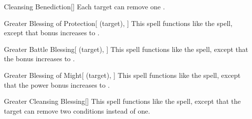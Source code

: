 \lowercase{\hypertarget{spell:Cleansing Benediction}{}}\label{spell:Cleansing Benediction}
\begin{freeability}[Rank 5]{\hypertarget{spell:Cleansing Benediction}{Cleansing Benediction}}[]
Each target can remove one .
\end{freeability}
\vspace{0.25em}



\lowercase{\hypertarget{spell:Greater Blessing of Protection}{}}\label{spell:Greater Blessing of Protection}
\begin{attuneability}[Rank 5]{\hypertarget{spell:Greater Blessing of Protection}{Greater Blessing of Protection}}[ (target), ]
This spell functions like the  spell, except that bonus increases to .
\end{attuneability}
\vspace{0.25em}



\lowercase{\hypertarget{spell:Greater Battle Blessing}{}}\label{spell:Greater Battle Blessing}
\begin{attuneability}[Rank 6]{\hypertarget{spell:Greater Battle Blessing}{Greater Battle Blessing}}[ (target), ]
This spell functions like the  spell, except that the bonus increases to .
\end{attuneability}
\vspace{0.25em}



\lowercase{\hypertarget{spell:Greater Blessing of Might}{}}\label{spell:Greater Blessing of Might}
\begin{attuneability}[Rank 6]{\hypertarget{spell:Greater Blessing of Might}{Greater Blessing of Might}}[ (target), ]
This spell functions like the  spell, except that the power bonus increases to .
\end{attuneability}
\vspace{0.25em}



\lowercase{\hypertarget{spell:Greater Cleansing Blessing}{}}\label{spell:Greater Cleansing Blessing}
\begin{freeability}[Rank 6]{\hypertarget{spell:Greater Cleansing Blessing}{Greater Cleansing Blessing}}[]
This spell functions like the  spell, except that the target can remove two conditions instead of one.
\end{freeability}
\vspace{0.25em}



